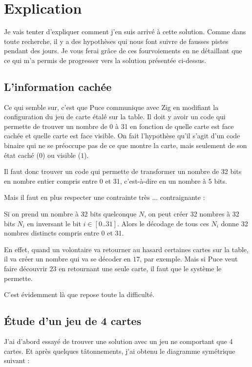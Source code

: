 \documentclass[10pt,a4paper,onecolumn]{article}
\begin{document}
\section{Explication}
Je vais tenter d'expliquer comment j'en suis arrivé à cette solution.
Comme dans toute recherche, il y a des hypothèses qui nous font suivre de fausses pistes pendant des jours. Je vous ferai grâce de ces fourvoiements en ne détaillant que ce qui m'a permis de progresser vers la solution présentée ci-dessus.

\subsection{L'information cachée}
Ce qui semble sur, c'est que Puce communique avec Zig en modifiant la configuration du jeu de carte étalé sur la table. Il doit y avoir un code qui permette de trouver un nombre de 0 à 31 en fonction de quelle carte est face cachée et quelle carte est face visible. On fait l'hypothèse qu'il s'agit d'un code binaire qui ne se préoccupe pas de ce que montre la carte, mais seulement de son état caché ($0$) ou visible ($1$).

Il faut donc trouver un code qui permette de transformer un nombre de 32 bits en nombre entier compris entre 0 et 31, c'est-à-dire en un nombre à 5 bits.

Mais il faut en plus respecter une contrainte très ... contraignante :

\par\noindent\hrulefill\par
{\large
Si on prend un nombre à 32 bits quelconque $N$, on peut créer 32 nombres à 32 bits $N_i$ en inversant le bit $i\in [0..31]$. Alors le décodage de tous ces $N_i$ donne 32 nombres distincts compris entre 0 et 31.
}
\par\noindent\hrulefill\par

En effet, quand un volontaire va retourner au hasard certaines cartes sur la table, il va créer un nombre qui va se décoder en $17$, par exemple. Mais si Puce veut faire découvrir $23$ en retournant une seule carte, il faut que le système le permette.

C'est évidemment là que repose toute la difficulté.

\subsection{Étude d'un jeu de 4 cartes}
J'ai d'abord essayé de trouver une solution avec un jeu ne comportant que 4 cartes. Et après quelques tâtonnements, j'ai obtenu le diagramme symétrique suivant :
\end{document}
